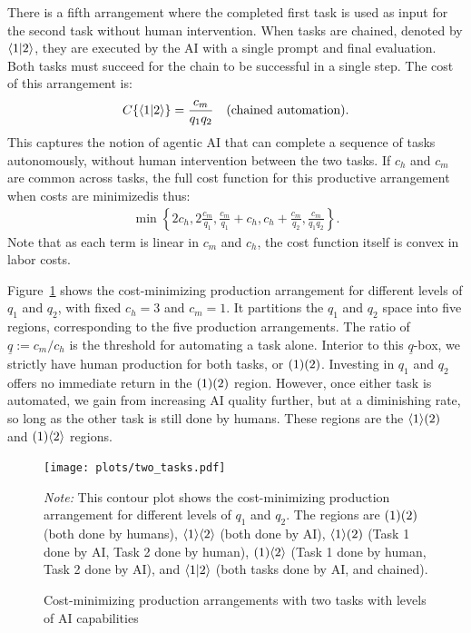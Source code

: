 \documentclass{article}
\theoremstyle{plain}
\theoremstyle{plain}
\begin{document}
There is a fifth arrangement where the completed first task is used as input for the second task without human intervention.
When tasks are chained, denoted by $\langle 1|2 \rangle$, they are executed by the AI with a single prompt and final evaluation.
Both tasks must succeed for the chain to be successful in a single step.
The cost of this arrangement is:
\begin{align*}
C\{ \langle 1|2 \rangle \} &= \frac{c_m}{q_1q_2} & \text{(chained automation)}.
\end{align*}
This captures the notion of agentic AI that can complete a sequence of tasks autonomously, without human intervention between the two tasks.
If $c_h$ and $c_m$ are common across tasks, the full cost function for this productive arrangement when costs are minimizedis thus: 
\begin{align}
  \min \left\{2c_h, 2 \frac{c_m}{q_1}, \frac{c_m}{q_1} + c_h, c_h + \frac{c_m}{q_2}, \frac{c_m}{q_1q_2} \right\}.
\end{align}
Note that as each term is linear in $c_m$ and $c_h$, the cost function itself is convex in labor costs. 

Figure~\ref{fig:two_tasks} shows the cost-minimizing production arrangement for different levels of $q_1$ and $q_2$, with fixed $c_h = 3$ and $c_m = 1$.
It partitions the $q_1$ and $q_2$ space into five regions, corresponding to the five production arrangements.
The ratio of $\underline{q} := c_m / c_h$ is the threshold for automating a task alone.
Interior to this $\underline{q}$-box, we strictly have human production for both tasks, or $( 1 )( 2 )$.
Investing in $q_1$ and $q_2$ offers no immediate return in the $( 1 )( 2 )$ region.
However, once either task is automated, we gain from increasing AI quality further, but at a diminishing rate, so long as the other task is still done by humans.
These regions are the $\langle 1 \rangle( 2 )$ and $( 1 )\langle 2 \rangle$ regions.

\begin{figure}
  \caption{Cost-minimizing production arrangements with two tasks with levels of AI capabilities} \label{fig:two_tasks}
  \begin{center}
  \texttt{[image: plots/two\_tasks.pdf]} \\
  \end{center}
\begin{footnotesize}
  \emph{Note:} This contour plot shows the cost-minimizing production arrangement for different levels of $q_1$ and $q_2$.
  The regions are $( 1 )( 2 )$ (both done by humans), $\langle 1 \rangle\langle 2 \rangle$ (both done by AI), $\langle 1 \rangle( 2 )$ (Task 1 done by AI, Task 2 done by human), $( 1 )\langle 2 \rangle$ (Task 1 done by human, Task 2 done by AI), and $\langle 1|2 \rangle$ (both tasks done by AI, and chained).
\end{footnotesize}
\end{figure}
\end{document}
